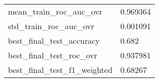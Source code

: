 \begin{tabular}{ll}
mean\_train\_roc\_auc\_ovr      &                                           0.969364 \\
std\_train\_roc\_auc\_ovr       &                                           0.001091 \\
best\_final\_test\_accuracy    &                                              0.682 \\
best\_final\_test\_roc\_ovr     &                                           0.937981 \\
best\_final\_test\_f1\_weighted &                                            0.68267 \\
\bottomrule
\end{tabular}
